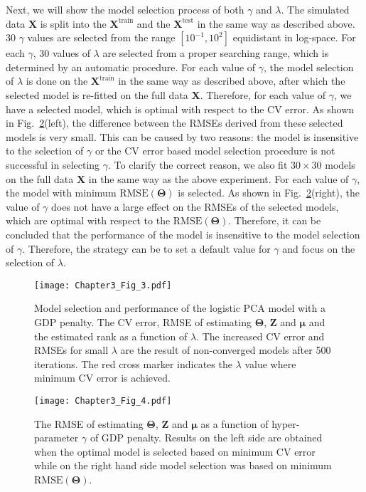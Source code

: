 Next, we will show the model selection process of both $\gamma$ and $\lambda$. The simulated data $\mathbf{X}$ is split into the $\mathbf{X}^{\text{train}}$ and the $\mathbf{X}^{\text{test}}$ in the same way as described above. 30 $\gamma$ values are selected from the range $[10^{-1},10^{2}]$ equidistant in log-space. For each $\gamma$, 30 values of $\lambda$ are selected from a proper searching range, which is determined by an automatic procedure. For each value of $\gamma$, the model selection of $\lambda$ is done on the $\mathbf{X}^{\text{train}}$ in the same way as described above, after which the selected model is re-fitted on the full data $\mathbf{X}$. Therefore, for each value of $\gamma$, we have a selected model, which is optimal with respect to the CV error. As shown in Fig.~\ref{chapter3_fig:4}(left), the difference between the RMSEs derived from these selected models is very small. This can be caused by two reasons: the model is insensitive to the selection of $\gamma$ or the CV error based model selection procedure is not successful in selecting $\gamma$. To clarify the correct reason, we also fit $30 \times 30$ models on the full data $\mathbf{X}$ in the same way as the above experiment. For each value of $\gamma$, the model with minimum $\text{RMSE}(\mathbf{\Theta})$ is selected. As shown in Fig.~\ref{chapter3_fig:4}(right), the value of $\gamma$ does not have a large effect on the RMSEs of the selected models, which are optimal with respect to the $\text{RMSE}(\mathbf{\Theta})$. Therefore, it can be concluded that the performance of the model is insensitive to the model selection of $\gamma$. Therefore, the strategy can be to set a default value for $\gamma$ and focus on the selection of $\lambda$.
\begin{figure}[htbp]
    \centering
    \texttt{[image: Chapter3\_Fig\_3.pdf]}
    \caption{Model selection and performance of the logistic PCA model with a GDP penalty. The CV error, RMSE of estimating $\mathbf{\Theta}$, $\mathbf{Z}$ and $\bm{\mu}$ and the estimated rank as a function of $\lambda$. The increased CV error and RMSEs for small $\lambda$ are the result of non-converged models after 500 iterations. The red cross marker indicates the $\lambda$ value where minimum CV error is achieved.}
	\label{chapter3_fig:3}
\end{figure}

\begin{figure}[htbp]
    \centering
    \texttt{[image: Chapter3\_Fig\_4.pdf]}
    \caption{The RMSE of estimating $\mathbf{\Theta}$, $\mathbf{Z}$ and $\bm{\mu}$ as a function of hyper-parameter $\gamma$ of GDP penalty. Results on the left side are obtained when the optimal model is selected based on minimum CV error while on the right hand side model selection was based on minimum  $\text{RMSE}(\mathbf{\Theta})$.}
    \label{chapter3_fig:4}
\end{figure}

